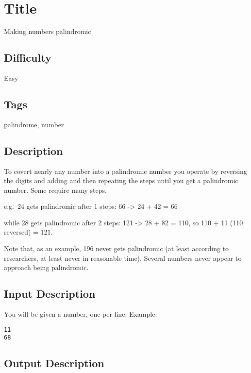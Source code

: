 \section{Title}\label{title-5}

Making numbers palindromic

\subsection{Difficulty}\label{difficulty-5}

Easy

\subsection{Tags}\label{tags-5}

palindrome, number

\subsection{Description}\label{description-5}

To covert nearly any number into a palindromic number you operate by
reversing the digits and adding and then repeating the steps until you
get a palindromic number. Some require many steps.

e.g.~24 gets palindromic after 1 steps: 66 -\textgreater{} 24 + 42 = 66

while 28 gets palindromic after 2 steps: 121 -\textgreater{} 28 + 82 =
110, so 110 + 11 (110 reversed) = 121.

Note that, as an example, 196 never gets palindromic (at least according
to researchers, at least never in reasonable time). Several numbers
never appear to approach being palindromic.

\subsection{Input Description}\label{input-description-4}

You will be given a number, one per line. Example:

\begin{verbatim}
11
68
\end{verbatim}

\subsection{Output Description}\label{output-description-4}

